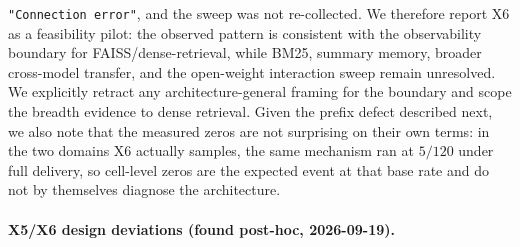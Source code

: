 \documentclass{article}
\begin{document}
\texttt{"Connection error"}, and the sweep was not re-collected. We therefore report X6 as a feasibility pilot: the observed pattern is consistent with the observability boundary for FAISS/dense-retrieval, while BM25, summary memory, broader cross-model transfer, and the open-weight interaction sweep remain unresolved. We explicitly retract any architecture-general framing for the boundary and scope the breadth evidence to dense retrieval. Given the prefix defect described next, we also note that the measured zeros are not surprising on their own terms: in the two domains X6 actually samples, the same mechanism ran at $5/120$ under full delivery, so cell-level zeros are the expected event at that base rate and do not by themselves diagnose the architecture.

\paragraph{X5/X6 design deviations (found post-hoc, 2026-09-19).}
\label{sec:x6-deviation}
\end{document}

